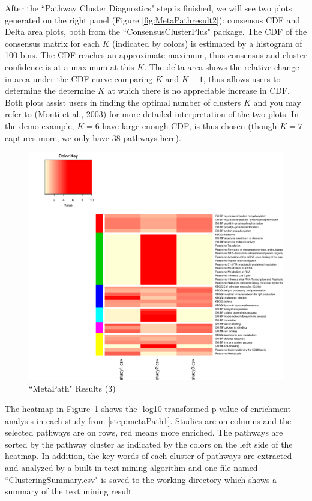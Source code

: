 After the ``Pathway Cluster Diagnostics" step is finished, we will see two plots generated on the right panel (Figure \ref{fig:MetaPathresult2}): consensus CDF and Delta area plots, both from the ``ConsensusClusterPlus" package. The CDF of the consensus matrix for each $K$ (indicated by colors) is estimated by a histogram of 100 bins. The CDF
reaches an approximate maximum, thus consensus and cluster confidence is at a maximum at this $K$. The delta area shows the relative change in area under the CDF curve comparing $K$ and $K - 1$, thus allows users to determine the determine $K$ at which there is no appreciable increase in CDF. Both plots assist users in finding the optimal number of clusters $K$ and you may refer to (Monti et al., 2003) for more detailed interpretation of the two plots. In the demo example, $K=6$ have large enough CDF, is thus chosen (though $K=7$ captures more, we only have 38 pathways here). 

\begin{figure}[H]
\begin{center}
\includegraphics[scale=0.6]{./figure/metaPath/Heatmap_clusters_all.pdf}
\caption{``MetaPath" Results (3)}
\label{fig:MetaPathresult3}
\end{center}
\end{figure}


The heatmap in Figure~\ref{fig:MetaPathresult3} shows the -log10 transformed p-value of enrichment analysis in each study from \ref{step:metaPath1}. 
Studies are on columns and the selected pathways are on rows, red means more enriched. The pathways are sorted by the pathway cluster as indicated by the colors on the left side of the heatmap. 
In addition, 
the key words of each cluster of pathways are extracted and analyzed by a built-in text mining algorithm and one file named ``Clustering\textunderscore Summary.csv" is saved to the working directory which shows a summary of the text mining result. 



